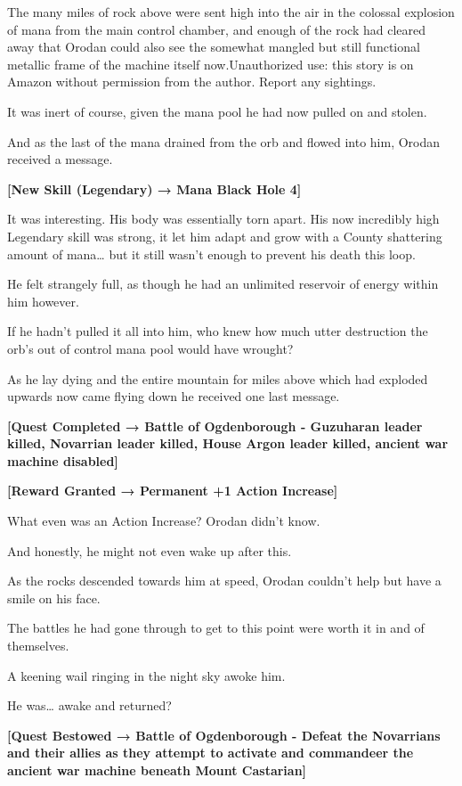 \documentclass[a4paper,10pt]{book}
\begin{document}
The many miles of rock above were sent high into the air in the colossal explosion of mana from the main control chamber, and enough of the rock had cleared away that Orodan could also see the somewhat mangled but still functional metallic frame of the machine itself now.Unauthorized use: this story is on Amazon without permission from the author. Report any sightings.\par
It was inert of course, given the mana pool he had now pulled on and stolen.\par
And as the last of the mana drained from the orb and flowed into him, Orodan received a message.\par
\textbf{[New Skill (Legendary) → Mana Black Hole 4]}\par
It was interesting. His body was essentially torn apart. His now incredibly high Legendary skill was strong, it let him adapt and grow with a County shattering amount of mana… but it still wasn’t enough to prevent his death this loop.\par
He felt strangely full, as though he had an unlimited reservoir of energy within him however.\par
If he hadn’t pulled it all into him, who knew how much utter destruction the orb’s out of control mana pool would have wrought?\par
As he lay dying and the entire mountain for miles above which had exploded upwards now came flying down he received one last message.\par
\textbf{[Quest Completed → Battle of Ogdenborough - Guzuharan leader killed, Novarrian leader killed, House Argon leader killed, ancient war machine disabled]}\par
\textbf{[Reward Granted → Permanent +1 Action Increase]}\par
What even was an Action Increase? Orodan didn’t know.\par
And honestly, he might not even wake up after this.\par
As the rocks descended towards him at speed, Orodan couldn’t help but have a smile on his face.\par
The battles he had gone through to get to this point were worth it in and of themselves.\par
\par
A keening wail ringing in the night sky awoke him.\par
He was… awake and returned?\par
\textbf{[Quest Bestowed → Battle of Ogdenborough - Defeat the Novarrians and their allies as they attempt to activate and commandeer the ancient war machine beneath Mount Castarian]}\par
\end{document}
